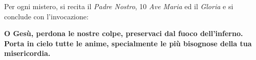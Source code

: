 
\vspace{1em}



\newpage



\newpage



\newpage



\vspace{1.5em}

\small{Per ogni mistero, si recita il \emph{Padre Nostro}, 10 \emph{Ave Maria} ed il \emph{Gloria} e si conclude con l'invocazione:}

\textbf{\small{O Gesù, perdona le nostre colpe, preservaci dal fuoco dell'inferno.\\
Porta in cielo tutte le anime, specialmente le più bisognose della tua misericordia.}}